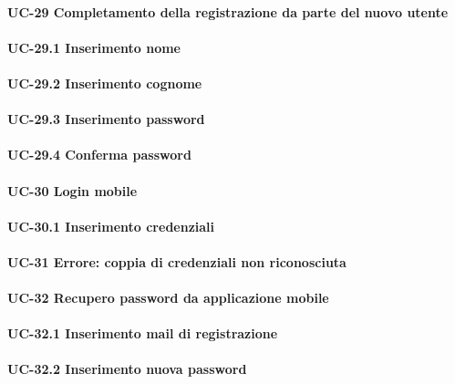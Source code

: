 
\paragraph{UC-29 Completamento della registrazione da parte del nuovo utente}

    \paragraph{UC-29.1 Inserimento nome}

    \paragraph{UC-29.2 Inserimento cognome}

    \paragraph{UC-29.3 Inserimento password}

    \paragraph{UC-29.4 Conferma password}

    
\paragraph{UC-30 Login mobile}

    \paragraph{UC-30.1 Inserimento credenziali}

\paragraph{UC-31 Errore: coppia di credenziali non riconosciuta}

\paragraph{UC-32 Recupero password da applicazione mobile}

    \paragraph{UC-32.1 Inserimento mail di registrazione}

    \paragraph{UC-32.2 Inserimento nuova password}

